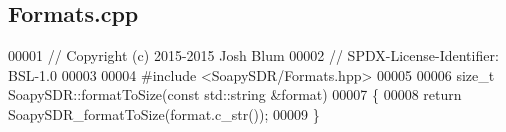 \subsection{Formats.\+cpp}
\label{Formats_8cpp_source}

\begin{DoxyCode}
00001 \textcolor{comment}{// Copyright (c) 2015-2015 Josh Blum}
00002 \textcolor{comment}{// SPDX-License-Identifier: BSL-1.0}
00003 
00004 \textcolor{preprocessor}{#include <SoapySDR/Formats.hpp>}
00005 
00006 \textcolor{keywordtype}{size\_t} SoapySDR::formatToSize(\textcolor{keyword}{const} std::string &format)
00007 \{
00008     \textcolor{keywordflow}{return} SoapySDR_formatToSize(format.c\_str());
00009 \}
\end{DoxyCode}
